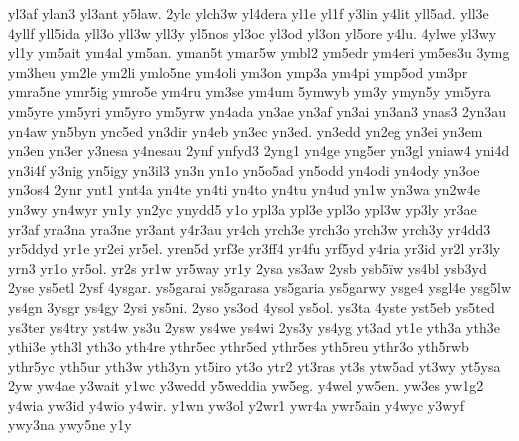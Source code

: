 {yl3af
ylan3
yl3ant
y5law.
2ylc
ylch3w
yl4dera
yl1e
yl1f
y3lin
y4lit
yll5ad.
yll3e
4yllf
yll5ida
yll3o
yll3w
yll3y
yl5nos
yl3oc
yl3od
yl3on
yl5ore
y4lu.
4ylwe
yl3wy
yl1y
ym5ait
ym4al
ym5an.
yman5t
ymar5w
ymbl2
ym5edr
ym4eri
ym5es3u
3ymg
ym3heu
ym2le
ym2li
ymlo5ne
ym4oli
ym3on
ymp3a
ym4pi
ymp5od
ym3pr
ymra5ne
ymr5ig
ymro5e
ym4ru
ym3se
ym4um
5ymwyb
ym3y
ymyn5y
ym5yra
ym5yre
ym5yri
ym5yro
ym5yrw
yn4ada
yn3ae
yn3af
yn3ai
yn3an3
ynas3
2yn3au
yn4aw
yn5byn
ync5ed
yn3dir
yn4eb
yn3ec
yn3ed.
yn3edd
yn2eg
yn3ei
yn3em
yn3en
yn3er
y3nesa
y4nesau
2ynf
ynfyd3
2yng1
yn4ge
yng5er
yn3gl
yniaw4
yni4d
yn3i4f
y3nig
yn5igy
yn3il3
yn3n
yn1o
yn5o5ad
yn5odd
yn4odi
yn4ody
yn3oe
yn3os4
2ynr
ynt1
ynt4a
yn4te
yn4ti
yn4to
yn4tu
yn4ud
yn1w
yn3wa
yn2w4e
yn3wy
yn4wyr
yn1y
yn2yc
ynydd5
y1o
ypl3a
ypl3e
ypl3o
ypl3w
yp3ly
yr3ae
yr3af
yra3na
yra3ne
yr3ant
y4r3au
yr4ch
yrch3e
yrch3o
yrch3w
yrch3y
yr4dd3
yr5ddyd
yr1e
yr2ei
yr5el.
yren5d
yrf3e
yr3ff4
yr4fu
yrf5yd
y4ria
yr3id
yr2l
yr3ly
yrn3
yr1o
yr5ol.
yr2s
yr1w
yr5way
yr1y
2ysa
ys3aw
2ysb
ysb5^^efw
ys4bl
ysb3yd
2yse
ys5etl
2ysf
4ysgar.
ys5garai
ys5garasa
ys5garia
ys5garwy
ysge4
ysgl4e
ysg5lw
ys4gn
3ysgr
ys4gy
2ysi
ys5ni.
2yso
ys3od
4ysol
ys5ol.
ys3ta
4yste
yst5eb
ys5ted
ys3ter
ys4try
yst4w
ys3u
2ysw
ys4we
ys4wi
2ys3y
ys4yg
yt3ad
yt1e
yth3a
yth3e
ythi3e
yth3l
yth3o
yth4re
ythr5ec
ythr5ed
ythr5es
yth5reu
ythr3o
yth5rwb
ythr5yc
yth5ur
yth3w
yth3yn
yt5iro
yt3o
ytr2
yt3ras
yt3s
ytw5ad
yt3wy
yt5ysa
2yw
yw4ae
y3wait
y1wc
y3wedd
y5weddia
yw5eg.
y4wel
yw5en.
yw3es
yw1g2
y4wia
yw3id
y4wio
y4wir.
y1wn
yw3ol
y2wr1
ywr4a
ywr5ain
y4wyc
y3wyf
ywy3na
ywy5ne
y1y
}
\endinput